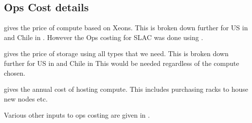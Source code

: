 \subsection{Ops Cost details}\label{sec:opsdetails}
 gives the price of compute based on Xeons.
This is broken down further for US in  and Chile in .
However the Ops costing for SLAC was done using .

 gives the price of storage using all  types that we need.
This is broken down further for US in  and Chile in 
This would be needed regardless of the compute chosen.








 gives the annual cost of hosting compute. This includes purchasing racks to house
new nodes etc.


Various other inputs to ops costing are given in .

